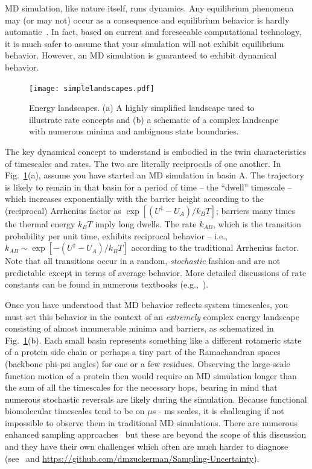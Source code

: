 \documentclass[9pt,bestpractices]{livecoms}
\begin{document}
MD simulation, like nature itself, runs dynamics.  
Any equilibrium phenomena may (or may not) occur as a consequence and equilibrium behavior is hardly automatic~\cite{Zuckerman:2010:}.  
In fact, based on current and foreseeable computational technology, it is much safer to assume that your simulation will not exhibit equilibrium behavior.  
However, an MD simulation is guaranteed to exhibit dynamical behavior.

\begin{figure}[h]
\centering
\texttt{[image: simplelandscapes.pdf]}
\caption{Energy landscapes.  (a) A highly simplified landscape used to illustrate rate concepts and (b) a schematic of a complex landscape with numerous minima and ambiguous state boundaries.}
\label{landscapes}
\end{figure}

The key dynamical concept to understand is embodied in the twin characteristics of timescales and rates.  
The two are literally reciprocals of one another.  
In Fig.\ \ref{landscapes}(a), assume you have started an MD simulation in basin A.  
The trajectory is likely to remain in that basin for a period of time -- the “dwell” timescale -- which increases exponentially with the barrier height according to the (reciprocal) Arrhenius factor as $\exp[(U^\ddagger - U_A)/k_B T]$; barriers many times the thermal energy $k_BT$ imply long dwells.  
The rate $k_{AB}$, which is the transition probability per unit time, exhibits reciprocal behavior -- i.e., $k_{AB} \sim \exp[-(U^\ddagger - U_A)/k_B T]$ according to the traditional Arrhenius factor.  
Note that all transitions occur in a random, \emph{stochastic} fashion and are not predictable except in terms of average behavior.  
More detailed discussions of rate constants can be found in numerous textbooks (e.g.,~\cite{DillBook, Zuckerman:2010:}).

Once you have understood that MD behavior reflects system timescales, you must set this behavior in the context of an \emph{extremely} complex energy landscape consisting of almost innumerable minima and barriers, as schematized in Fig.\ \ref{landscapes}(b).  
Each small basin represents something like a different rotameric state of a protein side chain or perhaps a tiny part of the Ramachandran spaces (backbone phi-psi angles) for one or a few residues.  
Observing the large-scale function motion of a protein then would require an MD simulation longer than the sum of all the timescales for the necessary hops, bearing in mind that numerous stochastic reversals are likely during the simulation.  
Because functional biomolecular timescales tend to be on $\mu$s - ms scales, it is challenging if not impossible to observe them in traditional MD simulations.  
There are numerous enhanced sampling approaches~\cite{Zuckerman:2011:Annu.Rev.Biophys., Chong:2017:CurrentOpinioninStructuralBiology} but these are beyond the scope of this discussion and they have their own challenges which often are much harder to diagnose (see~\cite{Grossfield:2009:AnnuRepComputChem} and  \url{https://github.com/dmzuckerman/Sampling-Uncertainty}).
\end{document}
